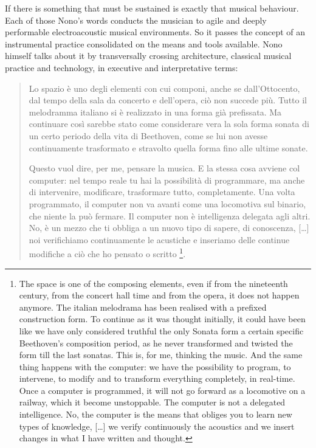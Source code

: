 \documentclass[twoside,a4paper]{article}
\begin{document}
If there is something that must be sustained is exactly that musical behaviour. Each of those Nono's words conducts the musician to agile and deeply performable electroacoustic musical environments. So it  passes the concept of an instrumental practice consolidated on the means and tools available. Nono himself talks about it by transversally crossing architecture, classical musical practice and technology, in executive and interpretative terms:

\begin{quote}
Lo spazio è uno degli elementi con cui componi, anche se dall'Ottocento, dal tempo della sala da concerto e dell'opera, ciò non succede più. 
Tutto il melodramma italiano si è realizzato in una forma già prefissata. Ma continuare così sarebbe stato come considerare vera la sola forma sonata di un certo periodo della vita di Beethoven, come se lui non avesse continuamente trasformato e stravolto quella forma fino alle ultime sonate. 

Questo vuol dire, per me, pensare la musica. E la stessa cosa avviene col computer: nel tempo reale tu hai la possibilità di programmare, ma anche di intervenire, modificare, trasformare tutto, completamente. Una volta programmato, il computer non va avanti come una locomotiva sul binario, che niente la può fermare. Il computer non è intelligenza delegata agli altri. No, è un mezzo che ti obbliga a un nuovo tipo di sapere, di conoscenza, [\ldots] %
noi verifichiamo continuamente le acustiche e inseriamo delle continue modifiche a ciò che ho pensato o scritto \cite{nono84}\footnote{The space is one of the composing elements, even if from the nineteenth century, from the concert hall time and from the opera, it does not happen anymore. The italian melodrama has been realised with a prefixed construction form. To continue as it was thought initially, it could have been like we have only considered truthful the only Sonata form a certain specific Beethoven's composition period, as he never transformed and twisted the form till the last sonatas. This is, for me, thinking the music. And the same thing happens with the computer: we have the possibility to program, to intervene, to modify and to transform everything completely, in real-time. Once a computer is programmed, it will not go forward as a locomotive on a railway, which it become unstoppable. The computer is not a delegated intelligence. No, the computer is the means that obliges you to learn new types of knowledge, [\ldots] we verify continuously the acoustics and we insert changes in what I have written and thought.}. 
\end{quote}
\end{document}
